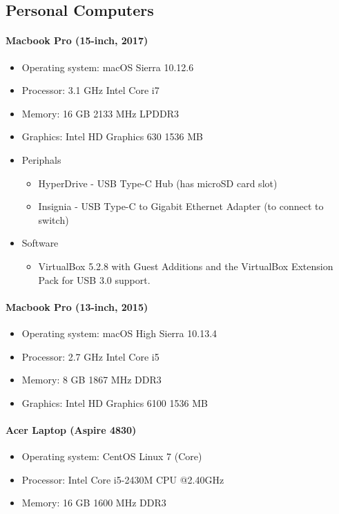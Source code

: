\subsection{Personal Computers}\label{ss:pcs}
\paragraph{Macbook Pro (15-inch, 2017)}
\begin{itemize}
        \item Operating system: macOS Sierra 10.12.6 
        \item Processor: 3.1 GHz Intel Core i7
        \item Memory: 16 GB 2133 MHz LPDDR3
        \item Graphics: Intel HD Graphics 630 1536 MB
        \item Periphals
        \begin{itemize}
                \item HyperDrive - USB Type-C Hub (has microSD card slot)
                \item Insignia - USB Type-C to Gigabit Ethernet
                Adapter (to connect to switch)
        \end{itemize}
        \item Software
        \begin{itemize}
                \item VirtualBox 5.2.8 with Guest Additions and the
                VirtualBox Extension Pack for USB 3.0 support.
        \end{itemize}
\end{itemize}

\paragraph{Macbook Pro (13-inch, 2015)}
\begin{itemize}
	\item Operating system: macOS High Sierra 10.13.4 
	\item Processor: 2.7 GHz Intel Core i5
	\item Memory: 8 GB 1867 MHz DDR3
	\item Graphics: Intel HD Graphics 6100 1536 MB
\end{itemize}

\paragraph{Acer Laptop (Aspire 4830)}
\begin{itemize}
	\item Operating system: CentOS Linux 7 (Core)
	\item Processor: Intel Core i5-2430M CPU @2.40GHz
	\item Memory: 16 GB 1600 MHz DDR3
\end{itemize}

